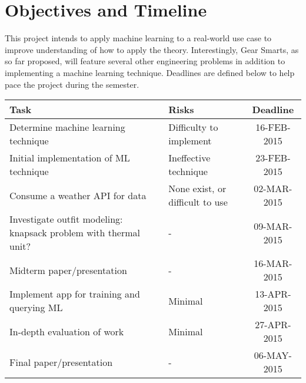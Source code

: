 \section{Objectives and Timeline}
\label{section:objectives}
This project intends to apply machine learning to a real-world use case to improve understanding of
how to apply the theory. Interestingly, Gear Smarts, as so far proposed, will
feature several other engineering problems in addition to implementing a machine learning technique.
Deadlines are defined below to help pace the project during the semester.

\begin{center}
 \begin{tabular}{||l l c ||}
 \hline
 \textbf{Task} & \textbf{Risks} & \textbf{Deadline} \\ [0.5ex]
 \hline\hline
 Determine machine learning technique & Difficulty to implement & 16-FEB-2015 \\
 \hline
 Initial implementation of ML technique & Ineffective technique & 23-FEB-2015 \\
 \hline
 Consume a weather API for data & None exist, or difficult to use & 02-MAR-2015 \\
 \hline
 Investigate outfit modeling: knapsack problem with thermal unit? & - & 09-MAR-2015 \\
 \hline
 Midterm paper/presentation & - & 16-MAR-2015 \\
 \hline
 Implement app for training and querying ML & Minimal & 13-APR-2015 \\
 \hline
 In-depth evaluation of work & Minimal & 27-APR-2015 \\
 \hline
 Final paper/presentation & - & 06-MAY-2015 \\
 \hline
\end{tabular}
\end{center}